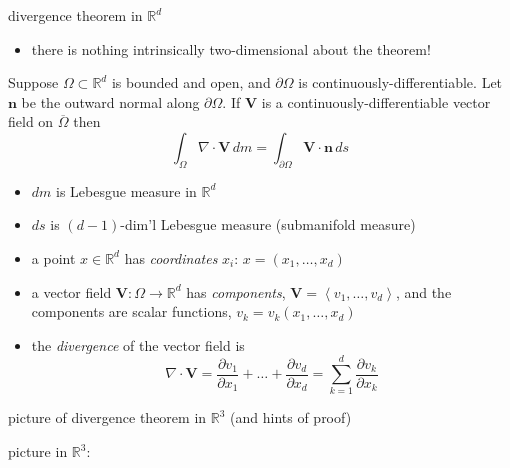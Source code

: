 \documentclass[10pt,
               svgnames,
               hyperref={colorlinks,
                         citecolor=DeepPink4,
                         linkcolor=FireBrick,
                         urlcolor=blue},
               usepdftitle=false]{beamer}
\newcommand{\bn}{\mathbf{n}}
\newcommand{\bV}{\mathbf{V}}
\newcommand{\RR}{\mathbb{R}}
\newcommand{\Div}{\nabla\cdot}
\begin{document}
\begin{frame}{divergence theorem in $\RR^d$}

\begin{itemize}
\item there is nothing intrinsically two-dimensional about the theorem!
\end{itemize}

\begin{theorem}
Suppose $\Omega\subset\RR^d$ is bounded and open, and $\partial \Omega$ is continuously-differentiable.  Let $\bn$ be the outward normal along $\partial \Omega$.  If $\bV$ is a continuously-differentiable vector field on $\overline{\Omega}$ then
	$$\int_\Omega \Div \bV\,dm = \int_{\partial\Omega} \bV\cdot \bn\,ds$$
\end{theorem}

\begin{itemize}
\item<2> $dm$ is Lebesgue measure in $\RR^d$
\item<2> $ds$ is $(d-1)$-dim'l Lebesgue measure (submanifold measure)
\item<2> a point $x\in\RR^d$ has \emph{coordinates} $x_i$: \quad $x = (x_1,\dots,x_d)$
\item<2> a vector field $\bV:\Omega \to \RR^d$ has \emph{components}, $\bV = \left<v_1,\dots,v_d\right>$, and the components are scalar functions, $v_k = v_k(x_1,\dots,x_d)$
\item<2> the \emph{divergence} of the vector field is
	$$\Div \bV = \frac{\partial v_1}{\partial x_1} + \dots + \frac{\partial v_d}{\partial x_d} = \sum_{k=1}^d \frac{\partial v_k}{\partial x_k}$$
\end{itemize}
\end{frame}


\begin{frame}{picture of divergence theorem in $\RR^3$ (and hints of proof)}

picture in $\RR^3$:

\vspace{70mm}
\end{frame}
\end{document}
